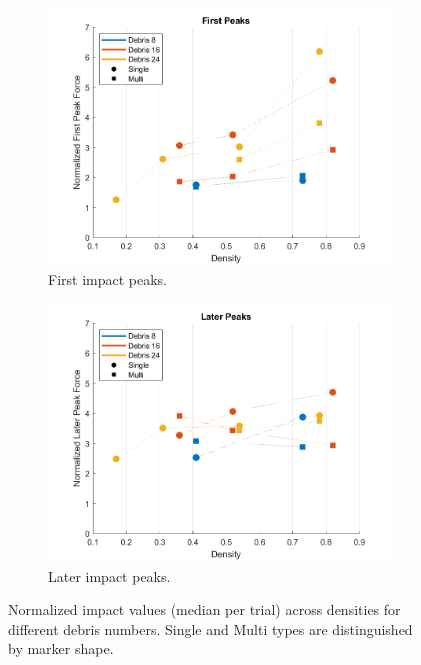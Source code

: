 \documentclass{article}
\begin{document}
\begin{figure}[htbp]
    \centering
    \begin{subfigure}[b]{0.48\textwidth}
        \centering
        \includegraphics[width=\textwidth]{Impact_FirstPeaks_densities combined.png}
        \caption{First impact peaks.}
        \label{fig:first_peaks_combined}
    \end{subfigure}
    \hfill
    \begin{subfigure}[b]{0.48\textwidth}
        \centering
        \includegraphics[width=\textwidth]{Impact_LaterPeaks_densities combined.png}
        \caption{Later impact peaks.}
        \label{fig:later_peaks_combined}
    \end{subfigure}
    \caption{Normalized impact values (median per trial) across densities for different debris numbers. Single and Multi types are distinguished by marker shape.}
    \label{fig:impact_peaks_combined}
\end{figure}
\end{document}
